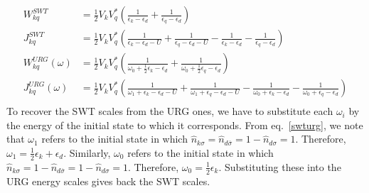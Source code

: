 \documentclass[twoside,11pt]{report}
\numberwithin{equation}{section}
\begin{document}
\begin{equation}\begin{aligned}
	W^{SWT}_{kq} &= \frac{1}{2} V_k V_q^*\left(\frac{1}{\epsilon_k - \epsilon_d} + \frac{1}{\epsilon_q - \epsilon_d}\right)\\
	J^{SWT}_{kq} &= \frac{1}{2} V_k V_q^*\left(\frac{1}{\epsilon_k - \epsilon_d - U} + \frac{1}{\epsilon_q - \epsilon_d - U} - \frac{1}{\epsilon_k - \epsilon_d} - \frac{1}{\epsilon_q - \epsilon_d}\right)\\
	W^{URG}_{kq}(\omega) &= \frac{1}{2} V_k V_q^*\left(\frac{1}{\omega_0 + \frac{1}{2} \epsilon_k - \epsilon_d} + \frac{1}{\omega_0 + \frac{1}{2} \epsilon_q - \epsilon_d}\right)\\
	J^{URG}_{kq}(\omega) &= \frac{1}{2} V_k V_q^*\left(\frac{1}{\omega_1 + \epsilon_k - \epsilon_d - U} + \frac{1}{\omega_1 +\epsilon_q - \epsilon_d - U} - \frac{1}{\omega_0 +\epsilon_k - \epsilon_d} - \frac{1}{\omega_0 +\epsilon_q - \epsilon_d}\right)\\
\end{aligned}\end{equation}
To recover the SWT scales from the URG ones, we have to substitute each \(\omega_i\) by the energy of the initial state to which it corresponds. From eq.~\ref{swturg}, we note that \(\omega_1\) refers to the initial state in which \(\hat n_{k\sigma}=\hat n_{d\overline\sigma} = 1 - \hat n_{d\sigma} = 1\). Therefore, \(\omega_1 = \frac{1}{2}\epsilon_k + \epsilon_d\). Similarly, \(\omega_0\) refers to the initial state in which \(\hat n_{k\sigma}=1 - \hat n_{d\overline\sigma} = 1 - \hat n_{d\sigma} = 1\). Therefore, \(\omega_0 = \frac{1}{2}\epsilon_k\). Substituting these into the URG energy scales gives back the SWT scales.
\end{document}
